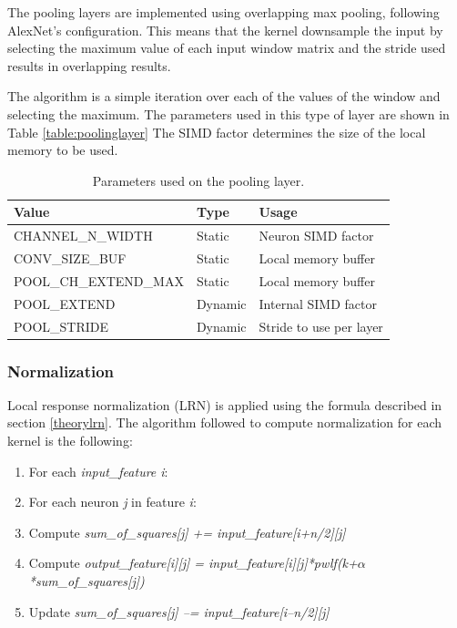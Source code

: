 \begin{enumerate}
The pooling layers are implemented using overlapping max pooling, following AlexNet's
configuration. This means that the kernel downsample the input by selecting the maximum
value of each input window matrix and the stride used results in overlapping results.

The algorithm is a simple iteration over each of the values of the window and selecting
the maximum. The parameters used in this type of layer are shown in Table \ref{table:poolinglayer}
The SIMD factor determines the size of the local memory to be used.

\begin{table}[H]
    \begin{center}
        \caption{Parameters used on the pooling layer.}
        \begin{tabular}{lll}
        \hline
        Value                 & Type    & Usage                   \\ \hline
        CHANNEL\_N\_WIDTH     & Static  & Neuron SIMD factor      \\
        CONV\_SIZE\_BUF       & Static  & Local memory buffer     \\
        POOL\_CH\_EXTEND\_MAX & Static  & Local memory buffer     \\
        POOL\_EXTEND          & Dynamic & Internal SIMD factor    \\
        POOL\_STRIDE          & Dynamic & Stride to use per layer \\ \hline
        \end{tabular}
        \label{tab:poolinglayer}
    \end{center}
\end{table}

\subsubsection{Normalization}

Local response normalization (LRN) is applied using the formula described in
section \ref{theorylrn}. The algorithm followed to compute normalization for
each kernel is the following:

\begin{enumerate}
    \item For each \textit{input\_feature i}:
    \item For each neuron \textit{j} in feature \textit{i}:
    \item Compute \textit{sum\_of\_squares[j] += input\_feature[i+n/2][j]}
    \item Compute \textit{output\_feature[i][j] = input\_feature[i][j]*pwlf(k+$\alpha$*sum\_of\_squares[j])}
    \item Update \textit{sum\_of\_squares[j] –= input\_feature[i–n/2][j]}
\end{enumerate}


\end{enumerate}
